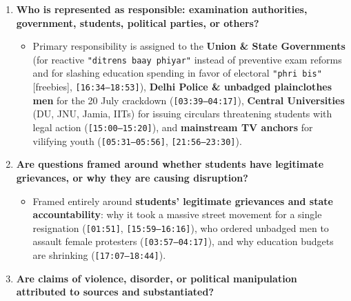 \documentclass[10pt,a4paper]{article}
\begin{document}
\begin{enumerate}[leftmargin=1.6em, itemsep=4pt, topsep=4pt]
  \begin{itemize}[leftmargin=1.4em, itemsep=2pt, topsep=2pt]
    \item Focuses squarely on the \textbf{original systemic grievance} (repeated paper leaks, student suicides, collapsing education budget from \texttt{4.5\%} to \texttt{2.5\%} of GDP, \texttt{[15:59--18:10]}) and \textbf{democratic civic solidarity} (\texttt{[07:21--08:16]}), while debunking claims of foreign funding (\texttt{[00:40--00:48]}).
  \end{itemize}
  \item \textbf{Who is represented as responsible: examination authorities, government, students, political parties, or others?}
  \begin{itemize}[leftmargin=1.4em, itemsep=2pt, topsep=2pt]
    \item Primary responsibility is assigned to the \textbf{Union \& State Governments} (for reactive \texttt{"ditrens baay phiyar"} instead of preventive exam reforms and for slashing education spending in favor of electoral \texttt{"phri bis"} [freebies], \texttt{[16:34--18:53]}), \textbf{Delhi Police \& unbadged plainclothes men} for the 20 July crackdown (\texttt{[03:39--04:17]}), \textbf{Central Universities} (DU, JNU, Jamia, IITs) for issuing circulars threatening students with legal action (\texttt{[15:00--15:20]}), and \textbf{mainstream TV anchors} for vilifying youth (\texttt{[05:31--05:56]}, \texttt{[21:56--23:30]}).
  \end{itemize}
  \item \textbf{Are questions framed around whether students have legitimate grievances, or why they are causing disruption?}
  \begin{itemize}[leftmargin=1.4em, itemsep=2pt, topsep=2pt]
    \item Framed entirely around \textbf{students' legitimate grievances and state accountability}: why it took a massive street movement for a single resignation (\texttt{[01:51]}, \texttt{[15:59--16:16]}), who ordered unbadged men to assault female protesters (\texttt{[03:57--04:17]}), and why education budgets are shrinking (\texttt{[17:07--18:44]}).
  \end{itemize}
  \item \textbf{Are claims of violence, disorder, or political manipulation attributed to sources and substantiated?}
  \begin{itemize}[leftmargin=1.4em, itemsep=2pt, topsep=2pt]

\end{itemize}
\end{enumerate}
\end{document}
